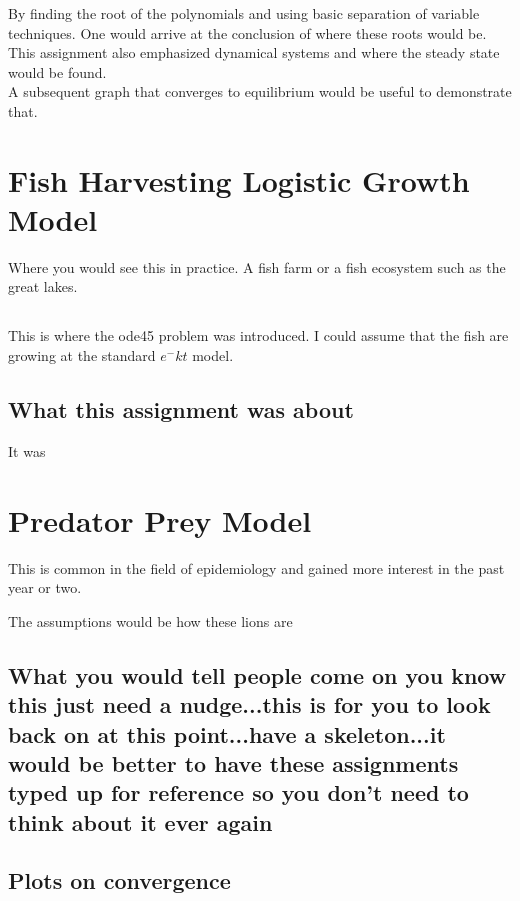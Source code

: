 By finding the root of the polynomials and using basic separation of variable techniques. One would arrive at the conclusion of where these roots would be. \\ 

This assignment also emphasized dynamical systems and where the steady state would be found. \\

A subsequent graph that converges to equilibrium would be useful to demonstrate that. 


\section{Fish Harvesting Logistic Growth Model}
Where you would see this in practice. A fish farm or a fish ecosystem such as the great lakes. \\  
\subsection{}
This is where the ode45 problem was introduced. 
I could assume that the fish are growing at the standard $e^-kt$ model.  

\subsection{What this assignment was about}

It was





\section{Predator Prey Model}

This is common in the field of epidemiology and gained more interest in the past year or two. 

The assumptions would be how these lions are 


\subsection{What you would tell people come on you know this just need a nudge...this is for you to look back on at this point...have a skeleton...it would be better to have these assignments typed up for reference so you don't need to think about it ever again}


\subsection{Plots on convergence}




